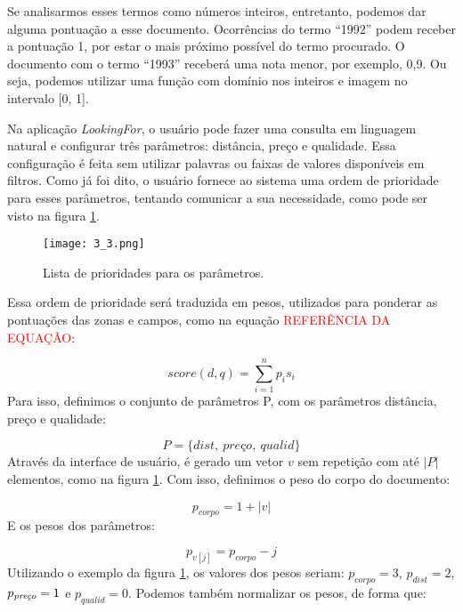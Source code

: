 Se analisarmos esses termos como números inteiros, entretanto, podemos dar alguma pontuação a esse documento. Ocorrências do termo ``1992'' podem receber a pontuação 1, por estar o mais próximo possível do termo procurado. O documento com o termo ``1993'' receberá uma nota menor, por exemplo, 0,9. Ou seja, podemos utilizar uma função com domínio nos inteiros e imagem no intervalo [0, 1].

Na aplicação \emph{LookingFor}, o usuário pode fazer uma consulta em linguagem natural e configurar três parâmetros: distância, preço e qualidade. Essa configuração é feita sem utilizar palavras ou faixas de valores disponíveis em filtros. Como já foi dito, o usuário fornece ao sistema uma ordem de prioridade para esses parâmetros, tentando comunicar a sua necessidade, como pode ser visto na figura \ref{fig:listprior}. 

\begin{figure}[!h]
  \centering
  \texttt{[image: 3\_3.png]} 
  \caption{Lista de prioridades para os parâmetros.}
  \label{fig:listprior} 
\end{figure}

Essa ordem de prioridade será traduzida em pesos, utilizados para ponderar as pontuações das zonas e campos, como na equação \textcolor{red}{REFERÊNCIA DA EQUAÇÃO}:

\begin{displaymath}
	score(d, q) = \sum_{i = 1}^n p_{i} s_{i}
\end{displaymath}
%
Para isso, definimos o conjunto de parâmetros P, com os parâmetros distância, preço e qualidade:

\begin{displaymath}
	P = \{dist,\ \textit{pre\c{c}o}, \ qualid\}
\end{displaymath}
%
Através da interface de usuário, é gerado um vetor $v$ sem repetição com até $|P|$ elementos, como na figura \ref{fig:listprior}. Com isso, definimos o peso do corpo do documento:

\begin{displaymath}
	p_{corpo} = 1 + |v|
\end{displaymath}
%
E os pesos dos parâmetros:

\begin{displaymath}
	p_{v[j]} = p_{corpo} - j
\end{displaymath}
%
Utilizando o exemplo da figura \ref{fig:listprior}, os valores dos pesos seriam: $p_{corpo}=3$, $p_{dist}=2$, $p_{\textit{\scriptsize pre\c{c}o}}=1$ e $p_{qualid}=0$. Podemos também normalizar os pesos, de forma que:

